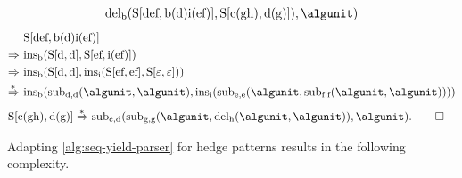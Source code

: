 \begin{example}
\begin{align*}
            \algsym{del}_{\text{b}}(
                \gramnt{S}[\text{def}, \text{b(d)i(ef)}],
                \gramnt{S}[\text{c(gh)}, \text{d(g)}]
            ),
            \algunit
        )
    \end{align*}
    \begin{align*}
        &\gramnt{S}[\text{def}, \text{b(d)i(ef)}]\\
        \gramrew\ & \algsym{ins}_{\text{b}}(
            \gramnt{S}[\text{d}, \text{d}],
            \gramnt{S}[\text{ef}, \text{i(ef)}]
        ) \\
        \gramrew\ & \algsym{ins}_{\text{b}}(
            \gramnt{S}[\text{d}, \text{d}],
            \algsym{ins}_{\text{i}}(
                \gramnt{S}[\text{ef}, \text{ef}],
                \gramnt{S}[\varepsilon, \varepsilon]
            )
        ) \\
        \gramRew\ & \algsym{ins}_{\text{b}}(
            \algsym{sub}_{\text{d},\text{d}}(\algunit, \algunit),
            \algsym{ins}_{\text{i}}(
                \algsym{sub}_{\text{e},\text{e}}(
                    \algunit,
                    \algsym{sub}_{\text{f},\text{f}}(\algunit, \algunit)
                )
            )
        )
    \end{align*}
    \begin{align*}
        &\gramnt{S}[\text{c(gh)},\text{d(g)}]
        \gramRew \algsym{sub}_{\text{c},\text{d}}(
            \algsym{sub}_{\text{g},\text{g}}(
                \algunit,
                \algsym{del}_{\text{h}}(\algunit, \algunit)
            ),
            \algunit
        ).
        \qedhere
    \end{align*}
\end{example}

Adapting \cref{alg:seq-yield-parser} for hedge patterns results in the following complexity.

